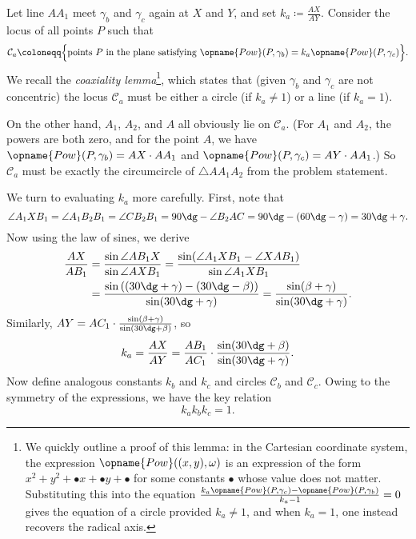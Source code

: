 \documentclass[11pt]{scrartcl}
\begin{document}
Let line $AA_1$ meet $\gamma_b$ and $\gamma_c$ again at $X$ and $Y$,
and set $k_a \coloneqq \frac{AX}{AY}$.
Consider the locus of all points $P$ such that
\[ \mathcal C_a \coloneqq \Big\{ \text{points } P \text{ in the plane satisfying }
    \opname{Pow}(P, \gamma_b) = k_a \opname{Pow}(P, \gamma_c) \Big\}. \]
We recall the \emph{coaxiality lemma}\footnote{We quickly outline a proof of this lemma:
  in the Cartesian coordinate system, the expression $\opname{Pow}((x,y), \omega)$
  is an expression of the form $x^2 + y^2 + {\bullet} x + {\bullet} y + {\bullet}$
  for some constants ${\bullet}$ whose value does not matter.
  Substituting this into the equation
  $\frac{k_a \opname{Pow}(P, \gamma_c) - \opname{Pow}(P, \gamma_b)}{k_a-1} = 0$
  gives the equation of a circle provided $k_a \neq 1$,
  and when $k_a = 1$, one instead recovers the radical axis.},
which states that (given $\gamma_b$ and $\gamma_c$ are not concentric)
the locus $\mathcal C_a$ must be either a circle (if $k_a \neq 1$) or a line (if $k_a=1$).

On the other hand, $A_1$, $A_2$, and $A$ all obviously lie on $\mathcal C_a$.
(For $A_1$ and $A_2$, the powers are both zero, and for the point $A$,
we have $\opname{Pow}(P, \gamma_b) = AX \cdot AA_1$
and $\opname{Pow}(P, \gamma_c) = AY \cdot AA_1$.)
So $\mathcal C_a$ must be exactly the circumcircle of $\triangle AA_1A_2$
from the problem statement.

We turn to evaluating $k_a$ more carefully.
First, note that
\[ \angle A_1XB_1 = \angle A_1B_2B_1 = \angle CB_2B_1
  = 90\dg - \angle B_2AC = 90\dg - (60\dg-\gamma) = 30\dg + \gamma. \]
Now using the law of sines, we derive
\begin{align*}
  \frac{AX}{AB_1} &= \frac{\sin \angle AB_1X}{\sin \angle AXB_1}
  = \frac{\sin(\angle A_1XB_1 - \angle XAB_1)}{\sin \angle A_1XB_1} \\
  &= \frac{\sin\left( (30\dg+\gamma)-(30\dg-\beta) \right)}{\sin (30\dg+\gamma)}
  = \frac{\sin(\beta+\gamma)}{\sin (30\dg+\gamma)}.
\end{align*}
Similarly, $AY = AC_1 \cdot \frac{\sin(\beta+\gamma)}{\sin(30\dg+\beta)}$, so
\[ k_a = \frac{AX}{AY}
  = \frac{AB_1}{AC_1} \cdot \frac{\sin(30\dg+\beta)}{\sin(30\dg+\gamma)}. \]
Now define analogous constants $k_b$ and $k_c$
and circles $\mathcal C_b$ and $\mathcal C_c$.
Owing to the symmetry of the expressions, we have the key relation
\[ k_a k_b k_c = 1. \]
\end{document}
